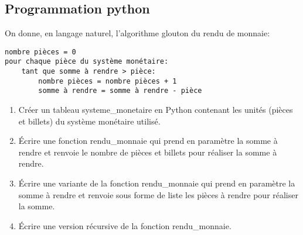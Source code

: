 \documentclass[11pt,a4paper]{article}
\begin{document}
\subsection*{Programmation python}

On donne, en langage naturel, l'algorithme glouton du rendu de monnaie:

\begin{lstlisting}
nombre pièces = 0
pour chaque pièce du système monétaire:
	tant que somme à rendre > pièce:
		nombre pièces = nombre pièces + 1
		somme à rendre = somme à rendre - pièce
\end{lstlisting}

\begin{enumerate}
\item Créer un tableau \textsf{systeme\_monetaire} en Python contenant les unités (pièces et billets) du système monétaire utilisé.

\item Écrire une fonction \textsf{rendu\_monnaie} qui prend en paramètre la somme à rendre et renvoie le nombre de pièces et billets pour réaliser la somme à rendre. 

\item Écrire une variante de la fonction \textsf{rendu\_monnaie} qui prend en paramètre la somme à rendre et renvoie sous forme de liste les pièces à rendre pour réaliser la somme. 


\item Écrire une version récursive de la fonction \textsf{rendu\_monnaie}.
\end{enumerate}
\end{document}
